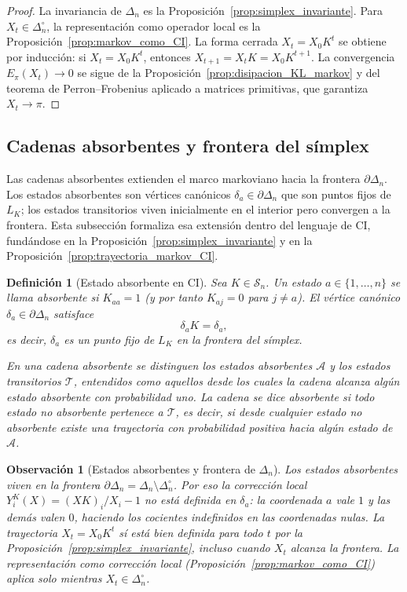 ﻿\documentclass[12pt]{article}
\newtheorem{definicion}{Definición}[section]
\newtheorem{observacion}{Observación}[section]
\begin{document}
\begin{proof}
La invariancia de $\Delta_n$ es la Proposición~\ref{prop:simplex_invariante}. Para $X_t\in\Delta_n^\circ$, la representación como operador local es la Proposición~\ref{prop:markov_como_CI}. La forma cerrada $X_t = X_0 K^t$ se obtiene por inducción: si $X_t = X_0 K^t$, entonces $X_{t+1} = X_t K = X_0 K^{t+1}$. La convergencia $E_\pi(X_t)\to 0$ se sigue de la Proposición~\ref{prop:disipacion_KL_markov} y del teorema de Perron--Frobenius aplicado a matrices primitivas, que garantiza $X_t \to \pi$.
\end{proof}

\subsection{Cadenas absorbentes y frontera del símplex}

Las cadenas absorbentes extienden el marco markoviano hacia la frontera $\partial\Delta_n$. Los estados absorbentes son vértices canónicos $\delta_a\in\partial\Delta_n$ que son puntos fijos de $L_K$; los estados transitorios viven inicialmente en el interior pero convergen a la frontera. Esta subsección formaliza esa extensión dentro del lenguaje de CI, fundándose en la Proposición~\ref{prop:simplex_invariante} y en la Proposición~\ref{prop:trayectoria_markov_CI}.

\begin{definicion}[Estado absorbente en CI]\label{def:estado_absorbente}
Sea $K\in\mathcal{S}_n$. Un estado $a\in\{1,\dots,n\}$ se llama \emph{absorbente} si $K_{aa}=1$ (y por tanto $K_{aj}=0$ para $j\neq a$). El vértice canónico $\delta_a\in\partial\Delta_n$ satisface
\[
\delta_a K = \delta_a,
\]
es decir, $\delta_a$ es un punto fijo de $L_K$ en la frontera del símplex.

En una cadena absorbente se distinguen los estados absorbentes $\mathcal{A}$ y los estados transitorios $\mathcal{T}$, entendidos como aquellos desde los cuales la cadena alcanza algún estado absorbente con probabilidad uno. La cadena se dice \emph{absorbente} si todo estado no absorbente pertenece a $\mathcal{T}$, es decir, si desde cualquier estado no absorbente existe una trayectoria con probabilidad positiva hacia algún estado de $\mathcal{A}$.
\end{definicion}

\begin{observacion}[Estados absorbentes y frontera de $\Delta_n$]\label{obs:absorbentes_frontera}
Los estados absorbentes viven en la frontera $\partial\Delta_n = \Delta_n\setminus\Delta_n^\circ$. Por eso la corrección local $Y^K_i(X) = (XK)_i/X_i - 1$ no está definida en $\delta_a$: la coordenada $a$ vale $1$ y las demás valen $0$, haciendo los cocientes indefinidos en las coordenadas nulas. La trayectoria $X_t = X_0 K^t$ sí está bien definida para todo $t$ por la Proposición~\ref{prop:simplex_invariante}, incluso cuando $X_t$ alcanza la frontera. La representación como corrección local (Proposición~\ref{prop:markov_como_CI}) aplica solo mientras $X_t\in\Delta_n^\circ$.
\end{observacion}
\end{document}

